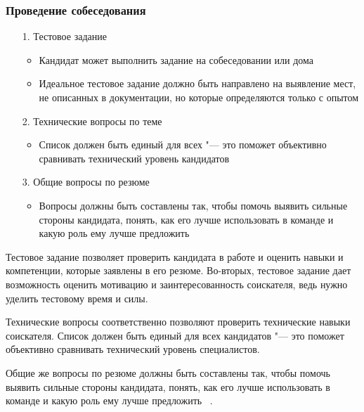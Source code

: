 \documentclass{../industrial-development}
\begin{document}
\begin{frame} \frametitle{Проведение собеседования}

	  \begin{itemize}
		\item[1.] Тестовое задание
	  \begin{itemize}
		\item Кандидат может выполнить задание на собеседовании или дома
		\item Идеальное тестовое задание должно быть направлено на выявление мест, не описанных в документации, но которые определяются только с опытом
		  \end{itemize}
			\item[2.] Технические вопросы по теме
			 \begin{itemize}
			\item Список должен быть единый для всех "--- это поможет объективно сравнивать технический уровень кандидатов
			 \end{itemize}
       \item[3.] Общие вопросы по резюме
				\begin{itemize}
        \item Вопросы должны быть составлены так, чтобы помочь выявить сильные стороны кандидата, понять, как его лучше использовать в команде и какую роль ему лучше предложить
				\end{itemize}
  \end{itemize}
\end{frame}

\lecturenotes

Тестовое задание позволяет проверить кандидата в работе и оценить навыки и компетенции, которые заявлены в его резюме. Во-вторых, тестовое задание дает возможность оценить мотивацию и заинтересованность соискателя, ведь нужно уделить тестовому время и силы.

Технические вопросы соответственно позволяют проверить технические навыки соискателя. Список должен быть единый для всех кандидатов "--- это поможет объективно сравнивать технический уровень специалистов.

Общие же вопросы по резюме должны быть составлены так, чтобы помочь выявить сильные стороны кандидата, понять, как его лучше использовать в команде и какую роль ему лучше предложить
~\cite[с.~280--281]{Pererva}.
\end{document}
